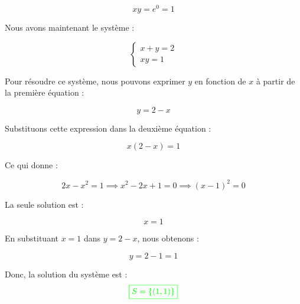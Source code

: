 \documentclass[12pt]{article}
\begin{document}
\[
xy = e^0 = 1
\]

Nous avons maintenant le système :

\[
\begin{cases}
x + y = 2 \\
xy = 1
\end{cases}
\]

Pour résoudre ce système, nous pouvons exprimer \(y\) en fonction de \(x\) à partir de la première équation :

\[
y = 2 - x
\]

Substituons cette expression dans la deuxième équation :

\[
x(2 - x) = 1
\]

Ce qui donne :

\[
2x - x^2 = 1 \implies x^2 - 2x + 1 = 0 \implies (x - 1)^2 = 0
\]

La seule solution est :

\[
x = 1
\]

En substituant \(x = 1\) dans \(y = 2 - x\), nous obtenons :

\[
y = 2 - 1 = 1
\]

Donc, la solution du système est :
\[
\textcolor{green}{\boxed{S=\left\lbrace (1, 1)\right\rbrace }}
\]
\end{document}
